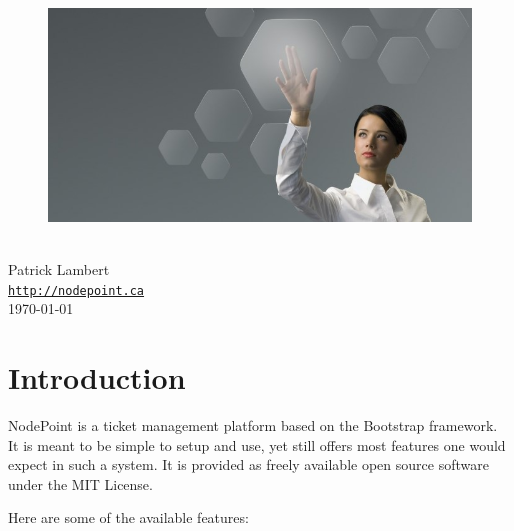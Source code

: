 \documentclass[11pt]{article}
\begin{document}
\begin{titlepage}
\bigskip
\begin{center}
\begin{figure}
\includegraphics{splash.jpg}
\end{figure}
\vspace*{1cm}
{
{\Huge \color{headings}{\NodePointManual}}\\
\bigskip
{\Large Patrick Lambert}\\
\texttt{\url{http://nodepoint.ca}}\\ 
\bigskip
\today}
\vspace*{\fill}
\end{center}
\end{titlepage}

\tableofcontents

\newpage

\section{Introduction}

NodePoint is a ticket management platform based on the Bootstrap framework. It is meant to be simple to setup and use, yet still offers most features one would expect in such a system. It is provided as freely available open source software under the MIT License.

Here are some of the available features:
\end{document}

